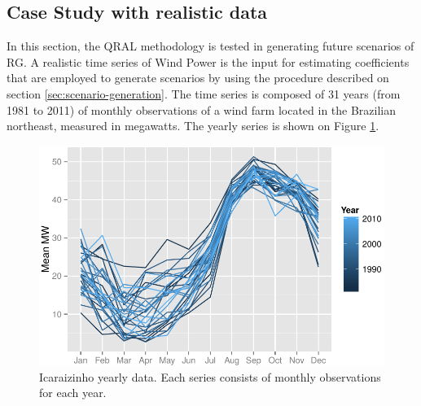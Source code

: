 
\subsection{Case Study with realistic data}

In this section, the QRAL methodology is tested in generating future scenarios of RG. A realistic time series of Wind Power is the input for estimating coefficients that are employed to generate scenarios by using the procedure described on section \ref{sec:scenario-generation}.
The time series is composed of 31 years (from 1981 to 2011) of monthly observations  of a wind farm located in the Brazilian northeast, measured in megawatts. The yearly series is shown on Figure \ref{fig:icaraizinho-mensal}.
\begin{figure}[h]
\centering
\includegraphics[width=0.8\linewidth]{Images/icaraizinho-mensal2}
\caption{Icaraizinho yearly data. Each series consists of monthly observations for each year.}
\label{fig:icaraizinho-mensal}
\end{figure}

